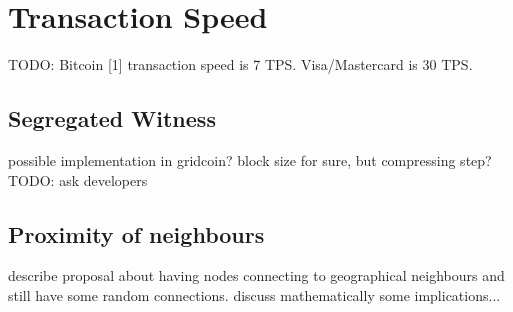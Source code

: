 \section{Transaction Speed}

TODO:
Bitcoin [1] transaction speed is 7 TPS.
Visa/Mastercard is 30 TPS.

\subsection{Segregated Witness}
possible implementation in gridcoin? 
block size for sure, but compressing step?
TODO: ask developers

\subsection{Proximity of neighbours}

describe proposal about having nodes connecting to geographical neighbours and still have some random connections.
discuss mathematically some implications...